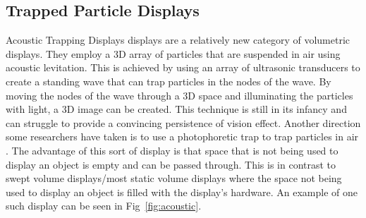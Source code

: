 \subsection{Trapped Particle Displays}
Acoustic Trapping Displays displays are a relatively new category of volumetric displays. They employ a 3D array of particles that are suspended in air using acoustic levitation. \cite{10.1063/1.5113467} \cite{Hirayama2019} This is achieved by using an array of ultrasonic transducers to create a standing wave that can trap particles in the nodes of the wave. By moving the nodes of the wave through a 3D space and illuminating the particles with light, a 3D image can be created. This technique is still in its infancy and can struggle to provide a convincing persistence of vision effect. Another direction some researchers have taken is to use a photophoretic trap to trap particles in air \cite{Smalley2018}. The advantage of this sort of display is that space that is not being used to display an object is empty and can be passed through. This is in contrast to swept volume displays/most static volume displays where the space not being used to display an object is filled with the display's hardware. An example of one such display can be seen in Fig~\ref{fig:acoustic}.

